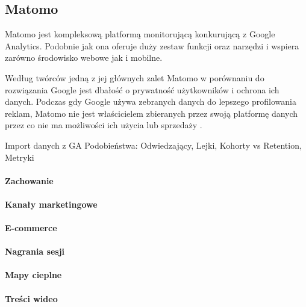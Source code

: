 \subsection{Matomo}
\label{sec:matomo}
Matomo jest kompleksową platformą monitorującą konkurującą z Google Analytics. Podobnie jak ona oferuje duży zestaw funkcji oraz narzędzi i wspiera zarówno środowisko webowe jak i mobilne. 

Według twórców jedną z jej głównych zalet Matomo w porównaniu do rozwiązania Google jest dbałość o prywatność użytkowników i ochrona ich danych. Podczas gdy Google używa zebranych danych do lepszego profilowania reklam, Matomo nie jest właścicielem zbieranych przez swoją platformę danych przez co nie ma możliwości ich użycia lub sprzedaży \cite{Matomo_Data}.

Import danych z GA
Podobieństwa: Odwiedzający, Lejki, Kohorty vs Retention, Metryki

\paragraph{Zachowanie}

\paragraph{Kanały marketingowe}

\paragraph{E-commerce}

\paragraph{Nagrania sesji}

\paragraph{Mapy cieplne}

\paragraph{Treści wideo}
